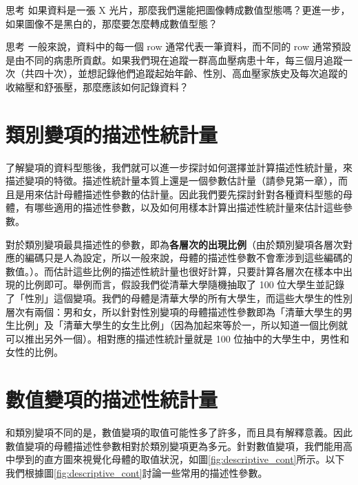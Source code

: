     \begin{custom}{思考}
        如果資料是一張 X 光片，那麼我們還能把圖像轉成數值型態嗎？更進一步，如果圖像不是黑白的，那麼要怎麼轉成數值型態？
    \end{custom}

    \begin{custom}{思考}
        一般來說，資料中的每一個 row 通常代表一筆資料，而不同的 row 通常預設是由不同的病患所貢獻。如果我們現在追蹤一群高血壓病患十年，每三個月追蹤一次（共四十次），並想記錄他們追蹤起始年齡、性別、高血壓家族史及每次追蹤的收縮壓和舒張壓，那麼應該如何記錄資料？
    \end{custom}
    
\section{類別變項的描述性統計量}
    了解變項的資料型態後，我們就可以進一步探討如何選擇並計算描述性統計量，來描述變項的特徵。描述性統計量本質上還是一個參數估計量（請參見第一章），而且是用來估計母體描述性參數的估計量。因此我們要先探討針對各種資料型態的母體，有哪些適用的描述性參數，以及如何用樣本計算出描述性統計量來估計這些參數。

    對於類別變項最具描述性的參數，即為\textbf{各層次的出現比例}（由於類別變項各層次對應的編碼只是人為設定，所以一般來說，母體的描述性參數不會牽涉到這些編碼的數值。）。而估計這些比例的描述性統計量也很好計算，只要計算各層次在樣本中出現的比例即可。舉例而言，假設我們從清華大學隨機抽取了 100 位大學生並記錄了「性別」這個變項。我們的母體是清華大學的所有大學生，而這些大學生的性別層次有兩個：男和女，所以針對性別變項的母體描述性參數即為「清華大學生的男生比例」及「清華大學生的女生比例」（因為加起來等於一，所以知道一個比例就可以推出另外一個）。相對應的描述性統計量就是 100 位抽中的大學生中，男性和女性的比例。

\section{數值變項的描述性統計量}
    和類別變項不同的是，數值變項的取值可能性多了許多，而且具有解釋意義。因此數值變項的母體描述性參數相對於類別變項更為多元。針對數值變項，我們能用高中學到的直方圖來視覺化母體的取值狀況，如圖\ref{fig:descriptive_cont}所示。以下我們根據圖\ref{fig:descriptive_cont}討論一些常用的描述性參數。

